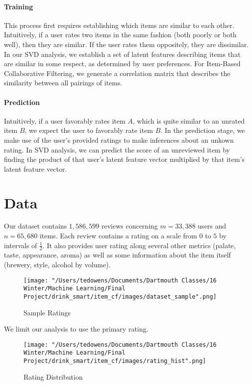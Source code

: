 \documentclass[12pt]{article}
\begin{document}
\paragraph{Training} This process first requires establishing which items are similar to each other. Intuitively, if a user rates two items in the same fashion (both poorly or both well), then they are similar. If the user rates them oppositely, they are dissimilar. In our SVD analysis, we establish a set of latent features describing items that are similar in some respect, as determined by user preferences. For Item-Based Collaborative Filtering, we generate a correlation matrix that describes the similarity between all pairings of items.

\paragraph{Prediction} Intuitively, if a user favorably rates item $A$, which is quite similar to an unrated item $B$, we expect the user to favorably rate item $B$. In the prediction stage, we make use of the user's provided ratings to make inferences about an unkown rating. In SVD analysis, we can predict the score of an unreviewed item by finding the product of that user's latent feature vector multiplied by that item's latent feature vector.

\section{Data}
Our dataset contains $1,586,599$ reviews concerning $m = 33,388$ users and $n = 65,680$ items. Each review contains a rating on a scale from $0$ to $5$ by intervals of $\frac{1}{2}$. It also provides user rating along several other metrics (palate, taste, appearance, aroma) as well as some information about the item itself (brewery, style, alcohol by volume).

\begin{figure}[!ht]
\begin{center}
\caption{Sample Ratings}
    \texttt{[image: "/Users/tedowens/Documents/Dartmouth Classes/16 Winter/Machine Learning/Final Project/drink\_smart/item\_cf/images/dataset\_sample".png]}
\end{center}
\end{figure}

We limit our analysis to use the primary rating.

\begin{figure}[!ht]
\begin{center}
\caption{Rating Distribution}
    \texttt{[image: "/Users/tedowens/Documents/Dartmouth Classes/16 Winter/Machine Learning/Final Project/drink\_smart/item\_cf/images/rating\_hist".png]}
\end{center}
\end{figure}
\end{document}
